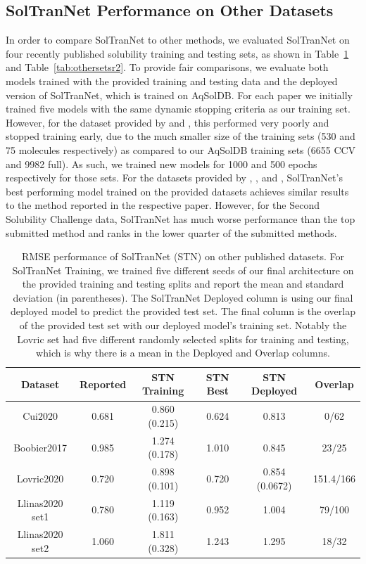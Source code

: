 \documentclass[journal=jmcmar,manuscript=article]{achemso}
\begin{document}
\subsection{SolTranNet Performance on Other Datasets}

In order to compare SolTranNet to other methods, we evaluated SolTranNet on four recently published solubility training and testing sets, as shown in Table~\ref{tab:othersetsrmse} and Table~\ref{tab:othersetsr2}.
To provide fair comparisons, we evaluate both models trained with the provided training and testing data and the deployed version of SolTranNet, which is trained on AqSolDB.
For each paper we initially trained five models with the same dynamic stopping criteria as our training set.
However, for the dataset provided by \citet{lovric} and \citet{boobier}, this performed very poorly and stopped training early, due to the much smaller size of the training sets (530 and 75 molecules respectively) as compared to our AqSolDB training sets (6655 CCV and 9982 full).
As such, we trained new models for 1000 and 500 epochs respectively for those sets.
For the datasets provided by \citet{cui}, \citet{lovric}, and \citet{boobier}, SolTranNet's best performing model trained on the provided datasets achieves similar results to the method reported in the respective paper.
However, for the Second Solubility Challenge data\cite{llinas}, SolTranNet has much worse performance than the top submitted method and ranks in the lower quarter of the submitted methods.

\begin{table}
    \centering
    \begin{tabular}{|c|c|c|c|c|c|}
        \hline
        Dataset &  Reported & STN Training &  STN Best & STN Deployed & Overlap \\
        \hline
        Cui2020 & 0.681 & 0.860 (0.215) & 0.624 & 0.813 & 0/62 \\
        Boobier2017 & 0.985 & 1.274 (0.178) & 1.010 & 0.845 & 23/25 \\
        Lovric2020 & 0.720 & 0.898 (0.101) & 0.720 & 0.854 (0.0672) & 151.4/166 \\
        Llinas2020 set1 & 0.780 & 1.119 (0.163) & 0.952 & 1.004 & 79/100 \\
        Llinas2020 set2 & 1.060 & 1.811 (0.328) & 1.243 & 1.295 & 18/32 \\
        \hline
    \end{tabular}
    \caption{RMSE performance of SolTranNet (STN) on other published datasets. For SolTranNet Training, we trained five different seeds of our final architecture on the provided training and testing splits and report the mean and standard deviation (in parentheses). The SolTranNet Deployed column is using our final deployed model to predict the provided test set. The final column is the overlap of the provided test set with our deployed model's training set. Notably the Lovric set had five different randomly selected splits for training and testing, which is why there is a mean in the Deployed and Overlap columns.}
    \label{tab:othersetsrmse}
\end{table}
\end{document}
